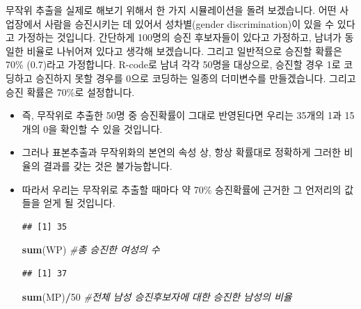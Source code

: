 \documentclass[]{book}
\newenvironment{Shaded}{\begin{snugshade}}{\end{snugshade}}
\newcommand{\CommentTok}[1]{\textcolor[rgb]{0.56,0.35,0.01}{\textit{#1}}}
\newcommand{\DecValTok}[1]{\textcolor[rgb]{0.00,0.00,0.81}{#1}}
\newcommand{\FloatTok}[1]{\textcolor[rgb]{0.00,0.00,0.81}{#1}}
\newcommand{\KeywordTok}[1]{\textcolor[rgb]{0.13,0.29,0.53}{\textbf{#1}}}
\newcommand{\NormalTok}[1]{#1}
\newcommand{\OperatorTok}[1]{\textcolor[rgb]{0.81,0.36,0.00}{\textbf{#1}}}
\newcommand{\StringTok}[1]{\textcolor[rgb]{0.31,0.60,0.02}{#1}}
\begin{document}
무작위 추출을 실제로 해보기 위해서 한 가지 시뮬레이션을 돌려 보겠습니다. 어떤 사업장에서 사람을 승진시키는 데 있어서 성차별(gender discrimination)이 있을 수 있다고 가정하는 것입니다. 간단하게 100명의 승진 후보자들이 있다고 가정하고, 남녀가 동일한 비율로 나뉘어져 있다고 생각해 보겠습니다. 그리고 일반적으로 승진할 확률은 70\% (0.7)라고 가정합니다. R-code로 남녀 각각 50명을 대상으로, 승진할 경우 1로 코딩하고 승진하지 못할 경우를 0으로 코딩하는 일종의 더미변수를 만들겠습니다. 그리고 승진 확률은 70\%로 설정합니다.

\begin{itemize}
\item
  즉, 무작위로 추출한 50명 중 승진확률이 그대로 반영된다면 우리는 35개의 1과 15개의 0을 확인할 수 있을 것입니다.
\item
  그러나 표본추출과 무작위화의 본연의 속성 상, 항상 확률대로 정확하게 그러한 비율의 결과를 갖는 것은 불가능합니다.
\item
  따라서 우리는 무작위로 추출할 때마다 약 70\% 승진확률에 근거한 그 언저리의 값들을 얻게 될 것입니다.

\begin{Shaded}
\end{Shaded}

\begin{verbatim}
## [1] 35
\end{verbatim}

\begin{Shaded}
\begin{Highlighting}[]
\KeywordTok{sum}\NormalTok{(WP) }\CommentTok{#총 승진한 여성의 수}
\end{Highlighting}
\end{Shaded}

\begin{verbatim}
## [1] 37
\end{verbatim}

\begin{Shaded}
\begin{Highlighting}[]
\KeywordTok{sum}\NormalTok{(MP)}\OperatorTok{/}\DecValTok{50} \CommentTok{#전체 남성 승진후보자에 대한 승진한 남성의 비율}
\end{Highlighting}
\end{Shaded}


\end{itemize}
\end{document}
